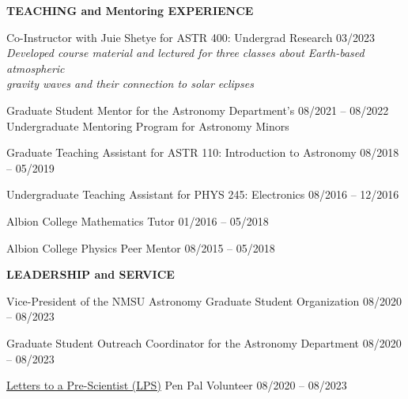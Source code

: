 \documentclass{resume} %
\begin{document}
\vspace{-0.1in}
\begin{rSection}{\textbf{TEACHING and Mentoring EXPERIENCE}}
\vspace{0.02in}

{Co-Instructor with Juie Shetye for ASTR 400: Undergrad Research} \hfill{03/2023} \\
{\emph{Developed course material and lectured for three classes about Earth-based atmospheric \\ gravity waves and their connection to solar eclipses}}


{Graduate Student Mentor for the Astronomy Department’s \hfill{08/2021 -- 08/2022} \\ Undergraduate Mentoring Program for Astronomy Minors} 

{Graduate Teaching Assistant for ASTR 110: Introduction to Astronomy} \hfill{08/2018 -- 05/2019}

{Undergraduate Teaching Assistant for PHYS 245: Electronics} \hfill{08/2016 -- 12/2016}

{Albion College Mathematics Tutor}  \hfill{ 01/2016 -- 05/2018}

{Albion College Physics Peer Mentor}  \hfill{08/2015 -- 05/2018}
\end{rSection}



\vspace{-0.1in}
\begin{rSection}{\textbf{LEADERSHIP and SERVICE}}
\vspace{0.02in}

{Vice-President of the NMSU Astronomy Graduate Student Organization \hfill{08/2020 -- 08/2023}} 

{Graduate Student Outreach Coordinator for the Astronomy Department} \hfill{08/2020 -- 08/2023}

{\href{https://prescientist.org/}{Letters to a Pre-Scientist (LPS)} Pen Pal Volunteer} \hfill{08/2020 -- 08/2023}
\end{rSection} 


\end{document}
